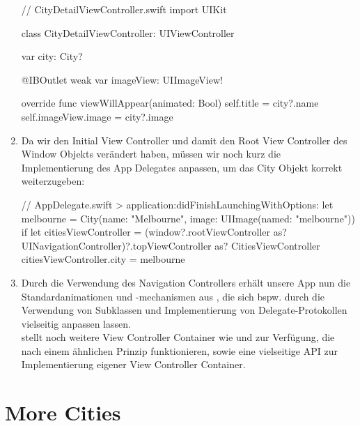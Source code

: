 \documentclass[parskip=half, final]{scrreprt}
\begin{document}
\begin{lecture}
\begin{enumerate}

\begin{swiftcode}
// CityDetailViewController.swift
import UIKit

class CityDetailViewController: UIViewController {
    var city: City?

    @IBOutlet weak var imageView: UIImageView!
    
    override func viewWillAppear(animated: Bool) {
        self.title = city?.name
        self.imageView.image = city?.image
    }
}
\end{swiftcode}

\item Da wir den Initial View Controller und damit den Root View Controller des Window Objekts verändert haben, müssen wir noch kurz die Implementierung des App Delegates anpassen, um das City Objekt korrekt weiterzugeben:

\begin{swiftcode}
// AppDelegate.swift > application:didFinishLaunchingWithOptions:
let melbourne = City(name: "Melbourne", image: UIImage(named: "melbourne"))
if let citiesViewController = (window?.rootViewController as? UINavigationController)?.topViewController as? CitiesViewController {
    citiesViewController.city = melbourne
}
\end{swiftcode}

\item Durch die Verwendung des Navigation Controllers erhält unsere App nun die Standardanimationen und -mechanismen aus  , die sich bspw. durch die Verwendung von Subklassen und Implementierung von Delegate-Protokollen vielseitig anpassen lassen. \\
	 stellt noch weitere View Controller Container wie  und  zur Verfügung, die nach einem ähnlichen Prinzip funktionieren, sowie eine vielseitige API zur Implementierung eigener View Controller Container.


\end{enumerate}


\section{More Cities}


\end{lecture}
\end{document}
